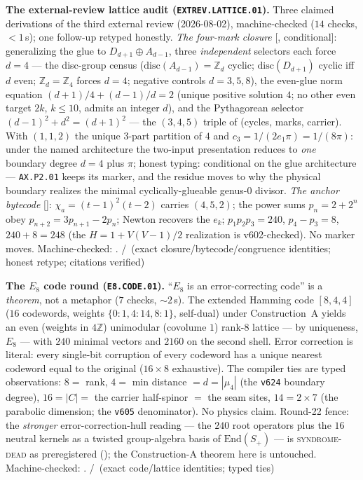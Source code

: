 \par\smallskip\noindent\textbf{The external-review lattice audit
(\texttt{EXTREV.LATTICE.01}).}
Three claimed derivations of the third external review (2026-08-02),
machine-checked ($14$ checks, ${<}1$\,s); one follow-up retyped
honestly.  \emph{The four-mark closure} [\mE, conditional]:
generalizing the glue to $D_{d+1}\oplus A_{d-1}$, three
\emph{independent} selectors each force $d=4$ --- the disc-group
census ($\mathrm{disc}(A_{d-1})=\mathbb Z_d$ cyclic;
$\mathrm{disc}(D_{d+1})$ cyclic iff $d$ even; $\mathbb Z_d=\mathbb
Z_4$ forces $d=4$; negative controls $d=3,5,8$), the even-glue norm
equation $(d{+}1)/4+(d{-}1)/d=2$ (unique positive solution $4$; no
other even target $2k$, $k\le10$, admits an integer $d$), and the
Pythagorean selector $(d{-}1)^2+d^2=(d{+}1)^2$ --- the $(3,4,5)$
triple of (cycles, marks, carrier).  With $(1,1,2)$ the unique
3-part partition of $4$ and $c_3=1/(2e_1\pi)=1/(8\pi)$: under the
named architecture the two-input presentation reduces to \emph{one}
boundary degree $d=4$ plus $\pi$; honest typing: conditional on the
glue architecture --- \texttt{AX.P2.01} keeps its marker, and the
residue moves to why the physical boundary realizes the minimal
cyclically-glueable genus-0 divisor.  \emph{The anchor bytecode}
[\mE]: $\chi_a=(t{-}1)^2(t{-}2)$ carries $(4,5,2)$; the power sums
$p_n=2+2^n$ obey $p_{n+2}=3p_{n+1}-2p_n$; Newton recovers the $e_k$;
$p_1p_2p_3=240$, $p_4-p_3=8$, $240+8=248$ (the $H=1+V(V{-}1)/2$
realization is v602-checked).  No marker moves.
Machine-checked: .
\mE/\mC\ (exact closure/bytecode/congruence identities; honest
retype; citations verified)
\par\smallskip

\par\smallskip\noindent\textbf{The $E_8$ code round
(\texttt{E8.CODE.01}).}
``$E_8$ is an error-correcting code'' is a \emph{theorem}, not a
metaphor ($7$ checks, ${\sim}2$\,s).  The extended Hamming code
$[8,4,4]$ ($16$ codewords, weights $\{0{:}1,4{:}14,8{:}1\}$, self-dual)
under Construction~A yields an even (weights in $4\mathbb Z$)
unimodular (covolume $1$) rank-$8$ lattice --- by uniqueness, $E_8$ ---
with $240$ minimal vectors and $2160$ on the second shell.  Error correction is
literal: every single-bit corruption of every codeword has a unique
nearest codeword equal to the original ($16\times8$ exhaustive).  The
compiler ties are typed observations: $8=$ rank, $4=$ min distance
$=d=|\mu_4|$ (the \texttt{v624} boundary degree), $16=|C|=$ the carrier
half-spinor $=$ the seam sites, $14=2\times7$ (the parabolic dimension;
the \texttt{v605} denominator).  No physics claim.  Round-22 fence:
the \emph{stronger} error-correction-hull reading --- the $240$ root
operators plus the $16$ neutral kernels as a twisted group-algebra
basis of $\mathrm{End}(S_+)$ --- is \textsc{syndrome-dead} as
preregistered (); the
Construction-A theorem here is untouched.
Machine-checked: .
\mE/\mC\ (exact code/lattice identities; typed ties)
\par\smallskip

